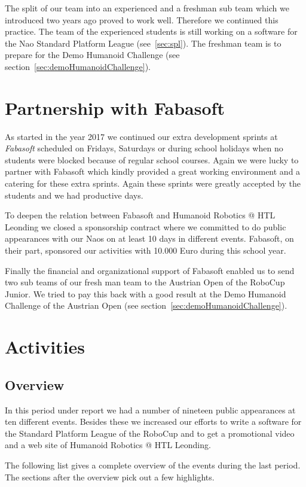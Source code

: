 \documentclass[11pt]{article}
\begin{document}
The split of our team into an experienced and a freshman sub team which we introduced two years ago proved to work well. Therefore we continued this practice. The team of the experienced students is still  working on a software for the Nao Standard Platform League (see~\ref{sec:spl}). The freshman team is to prepare for the Demo Humanoid Challenge (see section~\ref{sec:demoHumanoidChallenge}).

\section{Partnership with Fabasoft}
As started in the year 2017 we continued our extra development sprints at {\em Fabasoft} scheduled on Fridays, Saturdays or during school holidays when no students were blocked because of regular school courses. Again we were lucky to partner with Fabasoft which kindly provided a great working environment and a catering for these extra sprints. Again these sprints were greatly accepted by the students and we had productive days.

To deepen the relation between Fabasoft and Humanoid Robotics @ HTL Leonding we closed a sponsorship contract where we committed to do public appearances with our Naos on at least 10 days in different events. Fabasoft, on their part, sponsored our activities with 10.000 Euro during this school year.

Finally the financial and organizational support of Fabasoft enabled us to send two sub teams of our fresh man team to the Austrian Open of the RoboCup Junior. We tried to pay this back with a good result at the Demo Humanoid Challenge of the Austrian Open (see section~\ref{sec:demoHumanoidChallenge}).

\section{Activities}
\subsection{Overview}
In this period under report we had a number of nineteen public appearances at ten different events. Besides these we increased our efforts to write a software for the Standard Platform League of the RoboCup and to get a promotional video and a web site of Humanoid Robotics @ HTL Leonding.

The following list gives a complete overview of the events during the last period. The sections after the overview pick out a few highlights.
\end{document}

